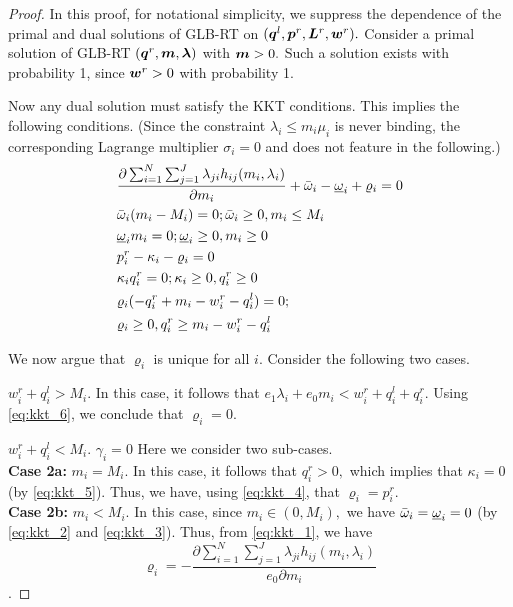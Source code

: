 \begin{proof}
  In this proof, for notational simplicity, we suppress the dependence
  of the primal and dual solutions of GLB-RT on
  $(\boldsymbol{q}^l,\boldsymbol{p}^r,\boldsymbol{L}^r,\boldsymbol{w}^r).$ Consider a
  primal solution of GLB-RT
  $(\boldsymbol{q}^r,\boldsymbol{m},\boldsymbol{\lambda})$ with $\boldsymbol{m} > 0.$
  Such a solution exists with probability 1, since $\boldsymbol{w}^r > 0$
  with probability 1.

  Now any dual solution must satisfy the KKT conditions. This implies
  the following conditions. (Since the constraint $\lambda_i \leq m_i
  \mu_i$ is never binding, the corresponding Lagrange multiplier
  $\sigma_i = 0$ and does not feature in the following.)
\begin{align}
  \label{eq:kkt_1}
  & \frac{\partial \sum_{i=1}^{N}\sum_{j=1}^{J} \lambda_{ji} h_{ij}(m_i,\lambda_i)}{\partial m_i} + \bar{\omega}_i - \underbar{$\omega$}_i + \varrho_i= 0 \\
  \label{eq:kkt_2}
  &\bar{\omega}_i(m_i - M_i) = 0; \bar{\omega}_i \geq 0, m_i \leq M_i \\
  \label{eq:kkt_3}
  &\underbar{$\omega$}_i m_i = 0; \underbar{$\omega$}_i \geq 0, m_i \geq 0 \\
  \label{eq:kkt_4}
  &p_i^r - \kappa_i - \varrho_i= 0 \\
  \label{eq:kkt_5}
  &\kappa_i q^r_i = 0; \kappa_i \geq 0, q^r_i \geq 0 \\
  \label{eq:kkt_6}
  &\varrho_i(-q^r_i + m_i - w^r_i - q^l_i)  = 0; \\
  \label{eq:kkt_7}
  &\varrho_i \geq 0, q^r_i \geq  m_i - w^r_i - q^l_i
\end{align}

We now argue that $\varrho_i$ is unique for all $i.$ Consider the
following two cases.

 $w^r_i + q^l_i > M_i.$ In this case, it
follows that $e_1 \lambda_i + e_0 m_i <w^r_i + q^l_i + q^r_i.$ Using \eqref{eq:kkt_6}, we
conclude that $\varrho_i = 0.$

 $w^r_i + q^l_i < M_i.$ $\gamma_i=0$ Here we consider two
sub-cases. \\
{\bf Case 2a:} $m_i = M_i.$ In this case, it follows that $q^r_i > 0,$
which implies that $\kappa_i = 0$ (by \eqref{eq:kkt_5}). Thus, we
have, using \eqref{eq:kkt_4}, that $\varrho_i = p^r_i.$\\
{\bf Case 2b:} $m_i < M_i.$ In this case, since $m_i \in (0,M_i),$ we
have $\bar{\omega}_i = \underbar{$\omega$}_i = 0$ 
(by \eqref{eq:kkt_2}
and \eqref{eq:kkt_3}). Thus, from \eqref{eq:kkt_1}, we
have 
\begin{equation}
\label{eq:der_closed_form}
\varrho_i = -\frac{\partial \sum_{i=1}^{N}\sum_{j=1}^{J} \lambda_{ji} h_{ij}(m_i,\lambda_i)}{e_0\partial m_i}
\end{equation}.


\end{proof}
